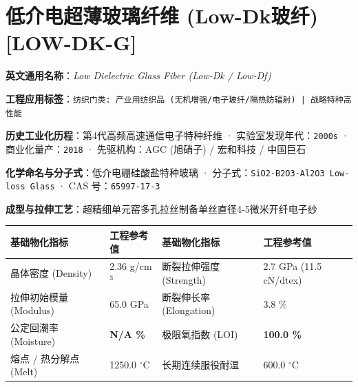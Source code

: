 \documentclass[11pt,openright,twoside,UTF8]{ctexbook}
\begin{document}
\section{低介电超薄玻璃纤维 (Low-Dk玻纤) [LOW-DK-G]}
\label{sec:low-dk-g}

\noindent\textbf{英文通用名称}：\textit{Low Dielectric Glass Fiber (Low-Dk / Low-Df)}\par
\noindent\textbf{工程应用标签}：\texttt{纺织门类: 产业用纺织品 (无机增强/电子玻纤/隔热防辐射) | 战略特种高性能}\par
\noindent\textbf{历史工业化历程}：第4代高频高速通信电子特种纤维 · 实验室发现年代：\texttt{2000s} · 商业化量产：\texttt{2018} · 先驱机构：AGC (旭硝子) / 宏和科技 / 中国巨石\par
\noindent\textbf{化学命名与分子式}：低介电硼硅酸盐特种玻璃 · 分子式：\texttt{SiO2-B2O3-Al2O3 Low-loss Glass} · CAS 号：\texttt{65997-17-3}\par
\noindent\textbf{成型与拉伸工艺}：超精细单元窑多孔拉丝制备单丝直径4-5微米开纤电子纱\par

\vspace{0.15cm}
\begin{center}
\small
\begin{tabularx}{\textwidth}{p{3.8cm}Xp{3.8cm}X}
\toprule
\textbf{基础物化指标} & \textbf{工程参考值} & \textbf{基础物化指标} & \textbf{工程参考值} \\
\midrule
晶体密度 (Density) & 2.36 g/cm$^3$ & 断裂拉伸强度 (Strength) & 2.7 GPa (11.5 cN/dtex) \\
拉伸初始模量 (Modulus) & 65.0 GPa & 断裂伸长率 (Elongation) & 3.8 \% \\
公定回潮率 (Moisture) & \textbf{N/A \%} & 极限氧指数 (LOI) & \textbf{100.0 \%} \\
熔点 / 热分解点 (Melt) & 1250.0 $^\circ\mathrm{C}$ & 长期连续服役耐温 & 600.0 $^\circ\mathrm{C}$ \\
\bottomrule
\end{tabularx}
\end{center}
\vspace{0.15cm}
\end{document}
